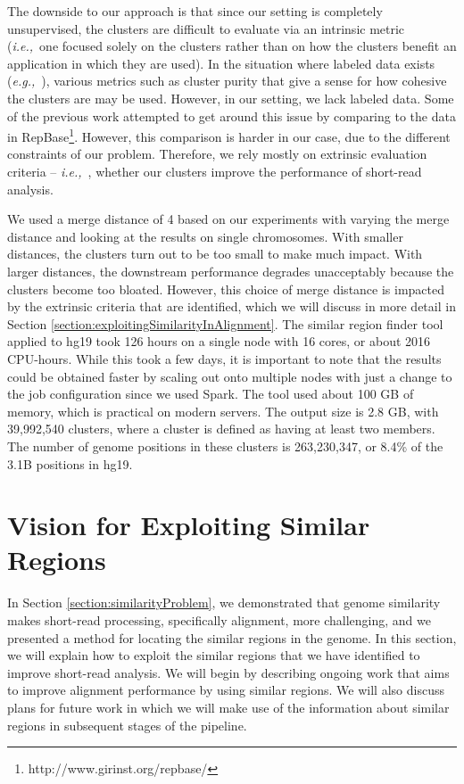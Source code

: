 \documentclass[twocolumn,10pt]{article}
\newcommand{\ie}{{\em i.e.,}~}
\newcommand{\eg}{{\em e.g.,}~}
\begin{document}
The downside to our approach is that since our setting is completely unsupervised, the clusters are difficult to evaluate via an intrinsic metric (\ie one focused solely on the clusters rather than on how the clusters benefit an application in which they are used).  In the situation where labeled data exists (\eg \cite{Cohen:2005}), various metrics such as cluster purity that give a sense for how cohesive the clusters are may be used.  However, in our setting, we lack labeled data.  Some of the previous work attempted to get around this issue by comparing to the data in RepBase\footnote{http://www.girinst.org/repbase/}.  However, this comparison is harder in our case, due to the different constraints of our problem.  Therefore, we rely mostly on extrinsic evaluation criteria -- \ie, whether our clusters improve the performance of short-read analysis.

We used a merge distance of 4 based on our experiments with varying the merge distance and looking at the results on single chromosomes.  With smaller distances, the clusters turn out to be too small to make much impact.  With larger distances, the downstream performance degrades unacceptably because the clusters become too bloated.  However, this choice of merge distance is impacted by the extrinsic criteria that are identified, which we will discuss in more detail in Section \ref{section:exploitingSimilarityInAlignment}.  The similar region finder tool applied to hg19 took 126 hours on a single node with 16 cores, or about 2016 CPU-hours.  While this took a few days, it is important to note that the results could be obtained faster by scaling out onto multiple nodes with just a change to the job configuration since we used Spark.  The tool used about 100 GB of memory, which is practical on modern servers.  The output size is 2.8 GB, with 39,992,540 clusters, where a cluster is defined as having at least two members.  The number of genome positions in these clusters is 263,230,347, or 8.4\% of the 3.1B positions in hg19.

\section{Vision for Exploiting Similar Regions}
\label{section:visionExploitingSimilarRegions}

In Section \ref{section:similarityProblem}, we demonstrated that genome similarity makes short-read processing, specifically alignment, more challenging, and we presented a method for locating the similar regions in the genome.  In this section, we will explain how to exploit the similar regions that we have identified to improve short-read analysis.  We will begin by describing ongoing work that aims to improve alignment performance by using similar regions.  We will also discuss plans for future work in which we will make use of the information about similar regions in subsequent stages of the pipeline.
\end{document}
